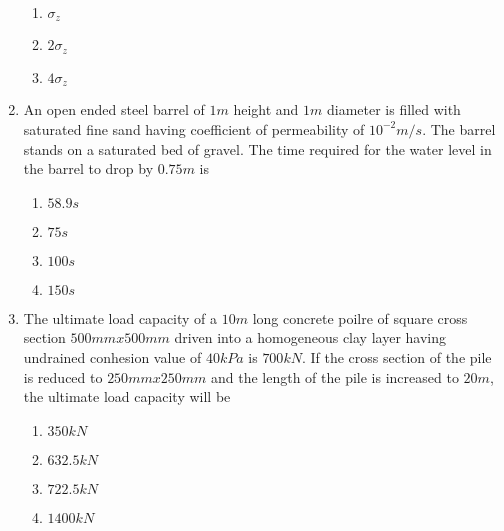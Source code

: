 \documentclass[journal]{IEEEtran}
\begin{document}
\begin{enumerate}
\begin{enumerate}
			\item $\sigma_{z}$
			\item $2 \sigma_{z}$
			\item $4 \sigma_{z}$
        	\end{enumerate}	
	\item An open ended steel barrel of $1 m$ height and $1 m$ diameter is filled with saturated fine sand having coefficient of permeability of $10^{-2} m / s$. The barrel stands on a saturated bed of gravel. The time required for the water level in the barrel to drop by $0.75 m$ is
		\begin{enumerate}
			\item $58.9 s$
			\item $75 s$
			\item $100 s$
			\item $150 s$
        	\end{enumerate}	
	\item The ultimate load capacity of a $10m$ long concrete poilre of square cross section $500 mm x 500 mm $ driven into a homogeneous clay layer having undrained conhesion value of $40kPa$ is $700kN$. If the cross section of the pile is reduced to $250mm x 250mm$ and the length of the pile is increased to $20m $, the ultimate load capacity will be 
		\begin{enumerate}
			\item $350 kN$
			\item $632.5 kN$
			\item $722.5 kN$
			\item $1400 kN$
        	\end{enumerate}	
\end{enumerate}	
\end{document}
